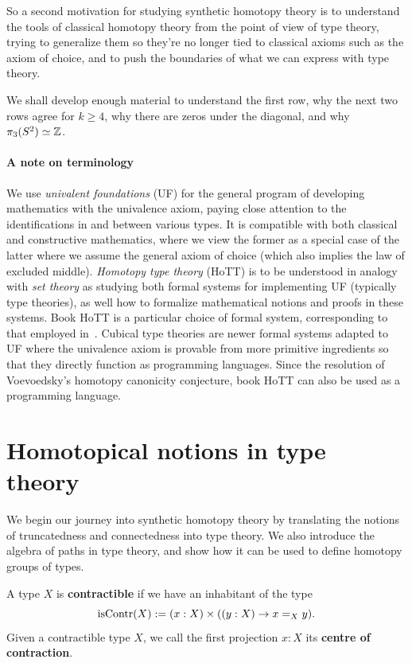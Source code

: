 \documentclass[10pt,oneside,leqno,openright]{memoir}
\begin{document}
So a second motivation for studying synthetic homotopy theory is to understand the tools of classical homotopy theory from the point of view of type theory, trying to generalize them so they're no longer tied to classical axioms such as the axiom of choice, and to push the boundaries of what we can express with type theory.

We shall develop enough material to understand the first row, why the next two rows agree for $k\ge 4$, why there are zeros under the diagonal, and why $\pi_3(S^2)\simeq \mathbb{Z}$.

\paragraph{A note on terminology}
We use \emph{univalent foundations} (UF) for the general program of developing mathematics with the univalence axiom, paying close attention to the identifications in and between various types. It is compatible with both classical and constructive mathematics, where we view the former as a special case of the latter where we assume the general axiom of choice (which also implies the law of excluded middle). \emph{Homotopy type theory} (HoTT) is to be understood in analogy with \emph{set theory} as studying both formal systems for implementing UF (typically type theories), as well how to formalize mathematical notions and proofs in these systems. Book HoTT is a particular choice of formal system, corresponding to that employed in~\textcite{hottbook}. Cubical type theories are newer formal systems adapted to UF where the univalence axiom is provable from more primitive ingredients so that they directly function as programming languages. Since the resolution of Voevoedsky's homotopy canonicity conjecture, book HoTT can also be used as a programming language.

\section{Homotopical notions in type theory}

We begin our journey into synthetic homotopy theory by translating the notions of truncatedness and connectedness into type theory.
We also introduce the algebra of paths in type theory, and show how it can be used to define homotopy groups of types.

\begin{definition}
    A type $X$ is \textbf{contractible} if we have an inhabitant of the type
    \[ \operatorname{isContr}(X) := (x : X) \times ((y : X) \to x =_X y). \]
   Given a contractible type $X$, we call the first projection $x:X$ its \textbf{centre of contraction}. 
\end{definition}
\end{document}
